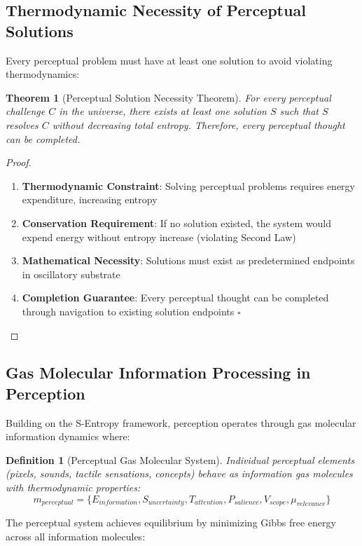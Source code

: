 \documentclass[12pt]{article}
\newtheorem{theorem}{Theorem}
\newtheorem{definition}{Definition}
\begin{document}
\subsection{Thermodynamic Necessity of Perceptual Solutions}

Every perceptual problem must have at least one solution to avoid violating thermodynamics:

\begin{theorem}[Perceptual Solution Necessity Theorem]
For every perceptual challenge $C$ in the universe, there exists at least one solution $S$ such that $S$ resolves $C$ without decreasing total entropy. Therefore, every perceptual thought can be completed.
\end{theorem}

\begin{proof}
\begin{enumerate}
\item \textbf{Thermodynamic Constraint}: Solving perceptual problems requires energy expenditure, increasing entropy
\item \textbf{Conservation Requirement}: If no solution existed, the system would expend energy without entropy increase (violating Second Law)
\item \textbf{Mathematical Necessity}: Solutions must exist as predetermined endpoints in oscillatory substrate
\item \textbf{Completion Guarantee}: Every perceptual thought can be completed through navigation to existing solution endpoints $\square$
\end{enumerate}
\end{proof}

\subsection{Gas Molecular Information Processing in Perception}

Building on the S-Entropy framework, perception operates through gas molecular information dynamics where:

\begin{definition}[Perceptual Gas Molecular System]
Individual perceptual elements (pixels, sounds, tactile sensations, concepts) behave as information gas molecules with thermodynamic properties:
$$m_{perceptual} = \{E_{information}, S_{uncertainty}, T_{attention}, P_{salience}, V_{scope}, \mu_{relevance}\}$$
\end{definition}

The perceptual system achieves equilibrium by minimizing Gibbs free energy across all information molecules:
\end{document}

